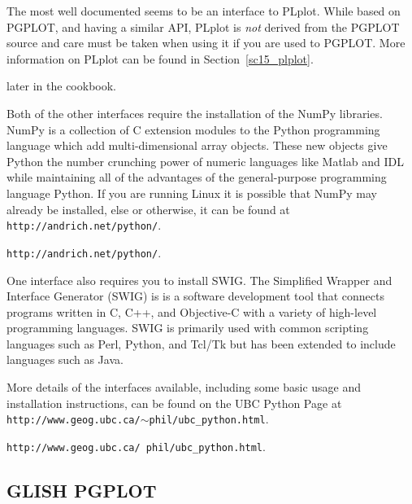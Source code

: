 \documentclass[twoside,11pt]{article}
\newcommand{\htmladdnormallink}[2]{#1}
\newcommand{\htmlref}[2]{#1}
\newcommand{\latex}[1]{#1}
\newcommand{\xlabel}[1]{}
\begin{document}
The most well documented seems to be an interface to
\htmladdnormallink{PLplot}{http://emma.la.asu.edu/plplot/}. While
based on PGPLOT, and having a similar API, PLplot is {\em not} derived
from the PGPLOT source and care must be taken when using it if you are
used to PGPLOT. More information on PLplot can be found \latex{ in
Section~\ref{sc15_plplot}.}
\begin{htmlonly}
\htmlref{later}{sc15_plplot} in the cookbook.
\end{htmlonly}

Both of the other interfaces require the installation of the
\htmladdnormallink{NumPy}{http://www.python.org/topics/scicomp/numpy.html}
libraries. NumPy is a collection of C extension modules to the Python
programming language which add multi-dimensional array objects. These
new objects give Python the number crunching power of numeric
languages like Matlab and IDL while maintaining all of the advantages
of the general-purpose programming language Python. If you are running
Linux it is possible that NumPy may already be installed, else or
otherwise, it can be found at \latex{{\tt
http://andrich.net/python/}.}
\begin{htmlonly}
\htmladdnormallink{{\tt http://andrich.net/python/}}{http://andrich.net/python/}.
\end{htmlonly}

One interface also requires you to install
\htmladdnormallink{SWIG}{http://www.swig.org/}. The Simplified Wrapper
and Interface Generator (SWIG) is is a software development tool that
connects programs written in C, C++, and Objective-C with a variety of
high-level programming languages. SWIG is primarily used with common
scripting languages such as Perl, Python, and Tcl/Tk but has been
extended to include languages such as Java.

More details of the interfaces available, including some basic usage
and installation instructions, can be found on the UBC Python Page at
\latex{{\tt http://www.geog.ubc.ca/$\sim$phil/ubc\_python.html}.}
\begin{htmlonly}
\htmladdnormallink{{\tt http://www.geog.ubc.ca/~phil/ubc_python.html}}{http://www.geog.ubc.ca/~phil/ubc_python.html}.
\end{htmlonly}

\subsection{\xlabel{sc15_pgglish}GLISH PGPLOT\label{sc15_pgglish}}
\end{document}
